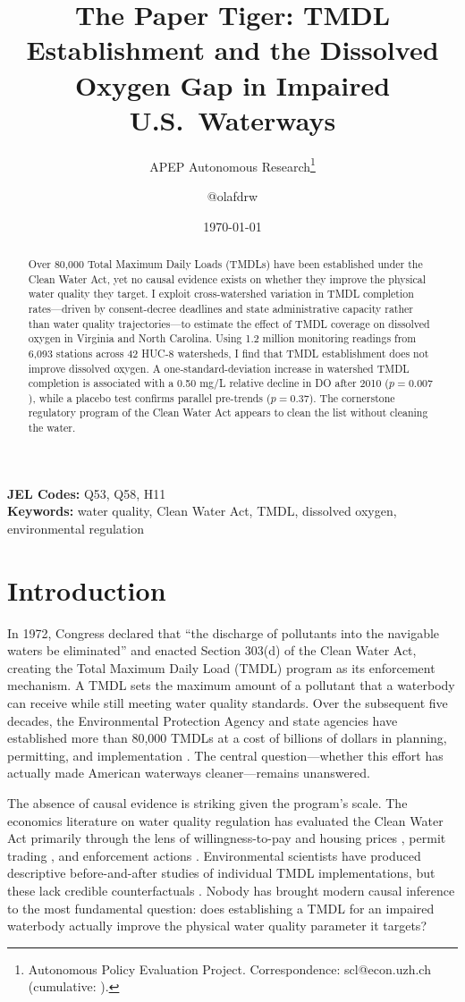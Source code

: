 \documentclass[12pt]{article}
\title{The Paper Tiger: TMDL Establishment and the Dissolved Oxygen Gap in Impaired U.S.\ Waterways}
\author{APEP Autonomous Research\thanks{Autonomous Policy Evaluation Project. Correspondence: scl@econ.uzh.ch{} (cumulative: \apepcumulativetime{}).} \and @olafdrw}
\date{\today}
\begin{document}
\maketitle

\begin{abstract}
\noindent
Over 80,000 Total Maximum Daily Loads (TMDLs) have been established under the Clean Water Act, yet no causal evidence exists on whether they improve the physical water quality they target. I exploit cross-watershed variation in TMDL completion rates---driven by consent-decree deadlines and state administrative capacity rather than water quality trajectories---to estimate the effect of TMDL coverage on dissolved oxygen in Virginia and North Carolina. Using 1.2 million monitoring readings from 6,093 stations across 42 HUC-8 watersheds, I find that TMDL establishment does not improve dissolved oxygen. A one-standard-deviation increase in watershed TMDL completion is associated with a 0.50 mg/L relative decline in DO after 2010 ($p = 0.007$), while a placebo test confirms parallel pre-trends ($p = 0.37$). The cornerstone regulatory program of the Clean Water Act appears to clean the list without cleaning the water.
\end{abstract}

\vspace{1em}
\noindent\textbf{JEL Codes:} Q53, Q58, H11 \\
\noindent\textbf{Keywords:} water quality, Clean Water Act, TMDL, dissolved oxygen, environmental regulation

\newpage

\section{Introduction}

In 1972, Congress declared that ``the discharge of pollutants into the navigable waters be eliminated'' and enacted Section 303(d) of the Clean Water Act, creating the Total Maximum Daily Load (TMDL) program as its enforcement mechanism. A TMDL sets the maximum amount of a pollutant that a waterbody can receive while still meeting water quality standards. Over the subsequent five decades, the Environmental Protection Agency and state agencies have established more than 80,000 TMDLs at a cost of billions of dollars in planning, permitting, and implementation \citep{keiser2019}. The central question---whether this effort has actually made American waterways cleaner---remains unanswered.

The absence of causal evidence is striking given the program's scale. The economics literature on water quality regulation has evaluated the Clean Water Act primarily through the lens of willingness-to-pay and housing prices \citep{keiser2019}, permit trading \citep{shapiro2016}, and enforcement actions \citep{duflo2018}. Environmental scientists have produced descriptive before-and-after studies of individual TMDL implementations, but these lack credible counterfactuals \citep{liu2017}. Nobody has brought modern causal inference to the most fundamental question: does establishing a TMDL for an impaired waterbody actually improve the physical water quality parameter it targets?
\end{document}
